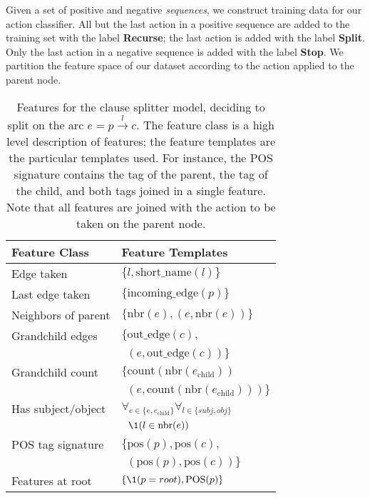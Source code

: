 
Given a set of positive and negative \textit{sequences}, we construct training
  data for our action classifier.
All but the last action in a positive sequence are added to the training set
  with the label \textbf{Recurse}; the last action is added with the label
  \textbf{Split}.
Only the last action in a negative sequence is added with the label \textbf{Stop}.
We partition the feature space of our dataset according to the action
  applied to the parent node.

%
%

\begin{table}
\begin{tabular}{ll}
  \textbf{Feature Class} & \textbf{Feature Templates} \\
  \hline
  Edge taken          & $\{ l, \textrm{short\_name}(l) \}$ \\
  Last edge taken     & $\{ \textrm{incoming\_edge}(p) \}$ \\
  Neighbors of parent & $\{ \textrm{nbr}(e), (e, \textrm{nbr}(e)) \}$ \\
  Grandchild edges    & $\{ \textrm{out\_edge}(c), $ \\
                      & $~~ (e, \textrm{out\_edge}(c)) \}$ \\
  Grandchild count    & $\{ \textrm{count}\left( \textrm{nbr}(e_\textrm{child}) \right) $ \\
                      & $~~ \left(e, \textrm{count}\left( \textrm{nbr}(e_\textrm{child}) \right) \right) \}$ \\
  Has subject/object  & $\forall_{e \in \{e, e_\textrm{child}\}} \forall_{l \in \{\textit{subj}, \textit{obj}\}} $ \\
                      & $~~ \1(l \in \textrm{nbr}(e)) $ \\
  POS tag signature   & $\{ \textrm{pos}(p), \textrm{pos}(c), $ \\
                      & $~~ \left( \textrm{pos}(p), \textrm{pos}(c) \right) \}$ \\
  Features at root    & $\{ \1(p = root), \textrm{POS}(p) \}$
\end{tabular}
\caption{\label{tab:features}
Features for the clause splitter model, deciding to split on the arc
  $e = p \xrightarrow{l} c$.
The feature class is a high level description of features; the feature
  templates are the particular templates used.
For instance, the POS signature contains the tag of the parent, the tag of
  the child, and both tags joined in a single feature.
Note that all features are joined with the action to be taken on the parent
  node.
}
\end{table}

